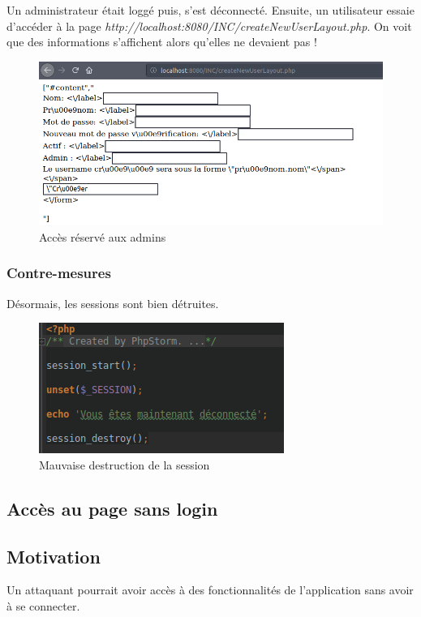 \documentclass[12pt]{article}
\begin{document}
Un administrateur était loggé puis, s'est déconnecté. Ensuite, un utilisateur essaie d'accéder à la page \textit{http://localhost:8080/INC/createNewUserLayout.php}. On voit que des informations s'affichent alors qu'elles ne devaient pas !
\begin{figure}[H]
\centering
\includegraphics[width=\linewidth]{images/exploitMauvaiseDestrucSess.png}
\caption{Accès réservé aux admins}
\end{figure}

\subsubsection{Contre-mesures}
Désormais, les sessions sont bien détruites.

\begin{figure}[H]
\centering
\includegraphics[width=\linewidth]{images/sessionDestroy.png}
\caption{Mauvaise destruction de la session}
\end{figure}

\subsection{Accès au page sans login}
\subsection{Motivation}
Un attaquant pourrait avoir accès à des fonctionnalités de l'application sans avoir à se connecter. 
\end{document}

